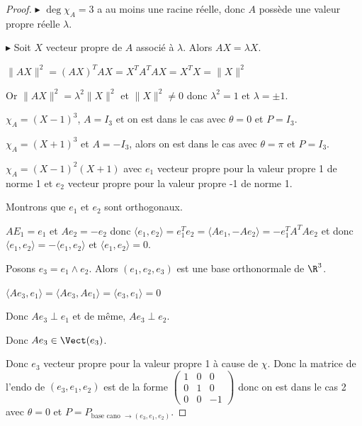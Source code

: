 \begin{proof}
    $\blacktriangleright$ $\deg \chi_A = 3$ a au moins une racine réelle, donc $A$ possède 
    une valeur propre réelle $\lambda$. 

    \avspace $\blacktriangleright$ Soit $X$ vecteur propre de $A$ associé à $\lambda$. 
    Alors $AX = \lambda X$. 

    $\| AX \|^2 = (AX)^T AX = X^T A^T A X = X^T X = \| X \|^2$ 

    Or $\| AX \|^2 = \lambda^2 \| X \|^2$ et $\| X \|^2 \neq 0$ donc $\lambda^2 = 1$ et $\lambda = \pm 1$.


    \svspace $\chi_A = (X - 1)^3$, $A = I_3$ et on est dans le cas avec $\theta = 0$ et $P = I_3$.


    \svspace $\chi_A = (X + 1)^3$ et $A = - I_3$, alors on est dans le cas avec $\theta = \pi$ et $P = I_3$.


    \svspace $\chi_A = (X - 1)^2 (X + 1)$ avec $e_1$ vecteur propre pour la valeur propre 1 de norme 1
    et $e_2$ vecteur propre pour la valeur propre -1 de norme 1.

    Montrons que $e_1$ et $e_2$ sont orthogonaux.

    $A E_1 = e_1$ et $A e_2 = - e_2$ donc $\langle e_1, e_2 \rangle = e_1^T e_2 = \langle A e_1, -A e_2 \rangle = - e_1^T A^T A e_2$
    et donc $\langle e_1, e_2 \rangle = - \langle e_1, e_2 \rangle$ et $\langle e_1, e_2 \rangle = 0$.

    Posons $e_3 = e_1 \wedge e_2$. Alors $(e_1, e_2, e_3)$ est une base orthonormale de $\R^3$. 

    $\langle A e_3, e_1 \rangle = \langle A e_3, A e_1 \rangle = \langle e_3, e_1 \rangle = 0$

    Donc $A e_3 \perp e_1$ et de même, $A e_3 \perp e_2$.

    Donc $A e_3 \in \Vect(e_3)$. 

    Donc $e_3$ vecteur propre pour la valeur propre 1 à cause de $\chi$. Donc la matrice de l'endo 
    de $(e_3, e_1, e_2)$ est de la forme $\begin{pmatrix}
        1 & 0 & 0\\
        0 & 1 & 0 \\
        0 & 0 & -1
        \end{pmatrix}$ donc on est dans le cas 2 avec $\theta = 0$ et 
        $P = P_{\text{base cano } \to (e_3, e_1, e_2)}$.


\end{proof}
